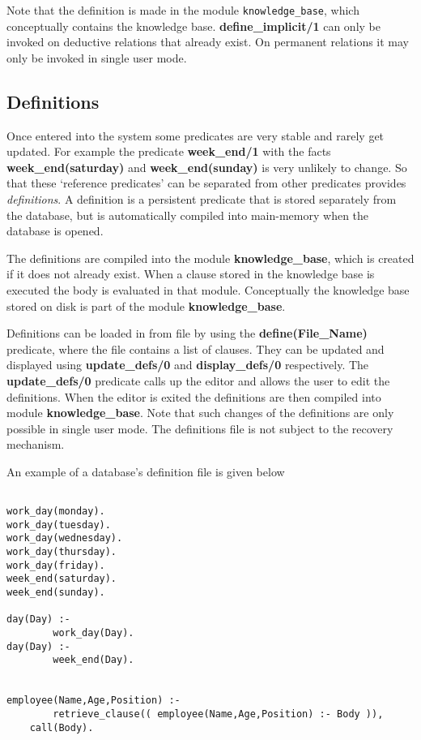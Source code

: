 Note that the definition is made in the module {\tt knowledge\_base},
which conceptually contains the knowledge base.
{\bf define\_implicit/1} can only be invoked on deductive
relations that already exist. On permanent relations it may only
be invoked in single user mode.

\subsection{Definitions}
Once entered into the system some predicates are very stable and rarely
get updated.
For example the predicate {\bf week\_end/1} with the facts
{\bf week\_end(saturday)} and {\bf week\_end(sunday)} is very unlikely
to change. So that these `reference predicates' can be separated from
other predicates \eclipse provides {\em definitions}.
A definition is a persistent predicate that is stored separately from
the database, but is automatically compiled into main-memory when the
database is opened.   

The definitions are compiled into the module {\bf knowledge\_base}, which
is created if it does not already exist. When a clause stored in the
knowledge base is executed the body is evaluated in that module. Conceptually
the knowledge base stored on disk is part of the module
{\bf knowledge\_base}. 

  
Definitions can be loaded in from file by using the {\bf define(File\_Name)}
predicate, where the file contains a list of clauses.
They can be updated and displayed using 
{\bf update\_defs/0} and {\bf display\_defs/0} respectively. The 
{\bf update\_defs/0} predicate calls up the editor and allows the user 
to edit the definitions.  When the editor is exited the definitions are 
then compiled into module {\bf knowledge\_base}. Note that such changes
of the definitions are only possible in single user mode.
The definitions file is not subject to the recovery mechanism. 

An example of a database's definition file is given below

\begin{verbatim}

work_day(monday).
work_day(tuesday).
work_day(wednesday).
work_day(thursday).
work_day(friday).
week_end(saturday).
week_end(sunday).

day(Day) :-
        work_day(Day).
day(Day) :-
        week_end(Day).


employee(Name,Age,Position) :-  
        retrieve_clause(( employee(Name,Age,Position) :- Body )),
	call(Body).
\end{verbatim}

